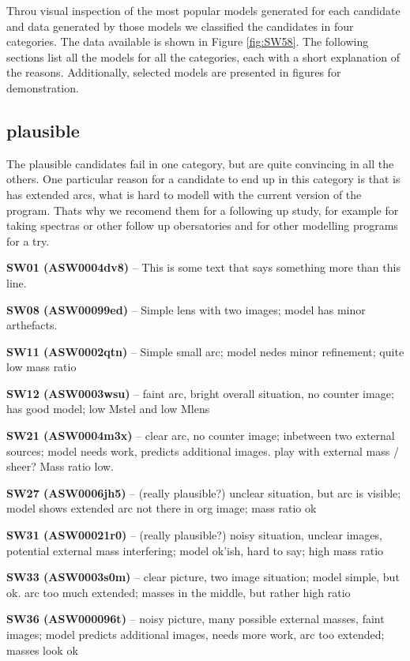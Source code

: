 \documentclass[fleqn,usenatbib]{mnras}
\newcommand{\lenstitle}[1]{\noindent\textbf{#1} --}
\newcommand{\figref}[1]{Figure \ref{fig:#1}}
\begin{document}
Throu visual inspection of the most popular models generated for each candidate and data generated by those models we classified the candidates in four categories.
The data available is shown in \figref{SW58}.
The following sections list all the models for all the categories, each with a short explanation of the reasons.
Additionally, selected models are presented in figures for demonstration.

\subsection{plausible}

The plausible candidates fail in one category, but are quite convincing in all the others.
One particular reason for a candidate to end up in this category is that is has extended arcs, what is hard to modell with the current version of the program.
Thats why we recomend them for a following up study, for example for taking spectras or other follow up obersatories and for other modelling programs for a try.


\lenstitle{SW01 (ASW0004dv8)}
  This is some text that says something more than this line.

\lenstitle{SW08 (ASW00099ed)}
  Simple lens with two images;
  model has minor arthefacts.

\lenstitle{SW11 (ASW0002qtn)}
  Simple small arc;
  model nedes minor refinement;
  quite low mass ratio
  
\lenstitle{SW12 (ASW0003wsu)} 
  faint arc, bright overall situation, no counter image;
  has good model;
  low Mstel and low Mlens
  
\lenstitle{SW21 (ASW0004m3x)} 
  clear arc, no counter image; inbetween two external sources;
  model needs work, predicts additional images. play with external mass / sheer?
  Mass ratio low.
  
\lenstitle{SW27 (ASW0006jh5)} 
  (really plausible?)
  unclear situation, but arc is visible;
  model shows extended arc not there in org image;
  mass ratio ok
  
\lenstitle{SW31 (ASW00021r0)} 
  (really plausible?)
  noisy situation, unclear images, potential external mass interfering;
  model ok'ish, hard to say;
  high mass ratio
  
\lenstitle{SW33 (ASW0003s0m)}
  clear picture, two image situation;
  model simple, but ok. arc too much extended;
  masses in the middle, but rather high ratio
  
\lenstitle{SW36 (ASW000096t)} 
  noisy picture, many possible external masses, faint images;
  model predicts additional images, needs more work, arc too extended;
  masses look ok
  
\end{document}
